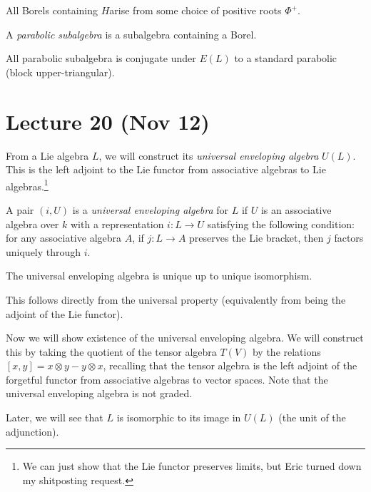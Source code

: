 \documentclass[twoside, 10pt]{article}
\begin{document}
    \begin{cor}
        All Borels containing $H$arise from some choice of positive roots $\Phi^+$.
    \end{cor}

    \begin{defn}
        A \textit{parabolic subalgebra} is a subalgebra containing a Borel.
    \end{defn}

    \begin{thm}
        All parabolic subalgebra is conjugate under $E(L)$ to a standard parabolic (block upper-triangular).
    \end{thm}

    \section{Lecture 20 (Nov 12)}%
    \label{sec:lecture_20_nov_12_}
    
    From a Lie algebra $L$, we will construct its \textit{universal enveloping algebra} $U(L)$. This is the left adjoint to the Lie functor from associative algebras to Lie algebras.\footnote{We can just show that the Lie functor preserves limits, but Eric turned down my shitposting request.}

    \begin{defn}
        A pair $(i,U)$ is a \textit{universal enveloping algebra} for $L$ if $U$ is an associative algebra over $k$ with a representation $i:L \to U$ satisfying the following condition: for any associative algebra $A$, if $j: L \to A$ preserves the Lie bracket, then $j$ factors uniquely through $i$.
    \end{defn}

    \begin{prop}
        The universal enveloping algebra is unique up to unique isomorphism.
    \end{prop}

    This follows directly from the universal property (equivalently from being the adjoint of the Lie functor).

    Now we will show existence of the universal enveloping algebra. We will construct this by taking the quotient of the tensor algebra $T(V)$ by the relations $[x,y] = x \otimes y - y \otimes x$, recalling that the tensor algebra is the left adjoint of the forgetful functor from associative algebras to vector spaces. Note that the universal enveloping algebra is not graded.

    \begin{rmk}
        Later, we will see that $L$ is isomorphic to its image in $U(L)$ (the unit of the adjunction).
    \end{rmk}
\end{document}
